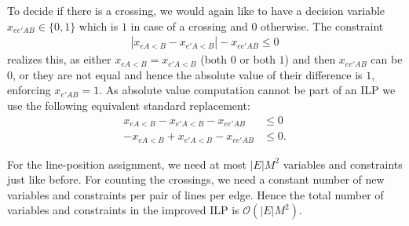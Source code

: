 \documentclass[sigconf]{acmart}
\begin{document}
To decide if there is a crossing, we would again like to have a decision variable $x_{ee'AB} \in \{0,1\}$ which is $1$ in case of a crossing and $0$ otherwise. The constraint
\begin{gather}
	\left|x_{eA<B}-x_{e'A<B}\right| - x_{ee'AB} \leq 0
\end{gather}
realizes this, as either $x_{eA<B} = x_{e'A<B}$ (both $0$ or both $1$) and then $x_{ee'AB}$ can be $0$, or they are not equal and hence the absolute value of their difference is $1$, enforcing $x_{e'AB}=1$. As absolute value computation cannot be part of an ILP we use the following equivalent standard replacement:
\begin{align}
	x_{eA<B} - x_{e'A<B} - x_{ee'AB} &\leq 0 \label{EQ:abs_upper}\\
	-x_{eA<B} + x_{e'A<B} - x_{ee'AB} &\leq 0. \label{EQ:abs_lower}
\end{align}

For the line-position assignment, we need at most $|E|M^{2}$ variables and constraints just like before.
For counting the  crossings, we need a constant number of new variables and constraints per pair of lines per edge.
Hence the total number of variables and constraints in the improved ILP is $\mathcal{O}(|E|M^{2})$.
\end{document}
